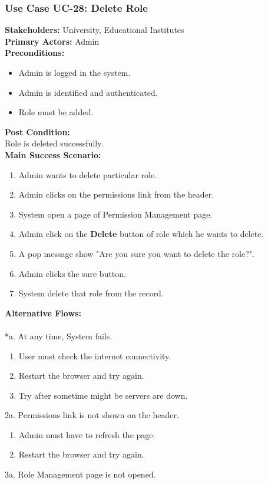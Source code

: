 \documentclass[12pt]{article}
\begin{document}
\subsubsection{Use Case UC-28: Delete Role}
\textbf{Stakeholders: } University, Educational Institutes \\
\textbf{Primary Actors: } Admin \\
\textbf{Preconditions:}
\begin{itemize}
\item Admin is logged in the system.
\item Admin is identified and authenticated.
\item Role must be added.
\end{itemize}
\textbf{Post Condition: }\\
Role is deleted successfully.\\
\textbf{Main Success Scenario:}
\begin{enumerate}
\item Admin wants to delete particular role.
\item Admin clicks on the permissions link from the header.
\item System open a page of Permission Management page.
\item Admin click on the \textbf{Delete} button of role which he wants to delete.
\item A pop message show "Are you sure you want to delete the role?".
\item Admin clicks the sure button.
\item System delete that role from the record.
\end{enumerate}
\textbf{Alternative Flows:}\\
\\
*a. At any time, System fails.
\begin{enumerate}
\item User must check the internet connectivity.
\item Restart the browser and try again.
\item Try after sometime might be servers are down.
\end{enumerate}
\newpage
2a. Permissions link is not shown on the header.
\begin{enumerate}
\item Admin must have to refresh the page.
\item Restart the browser and try again.
\end{enumerate} 
3a. Role Management page is not opened.
\end{document}
